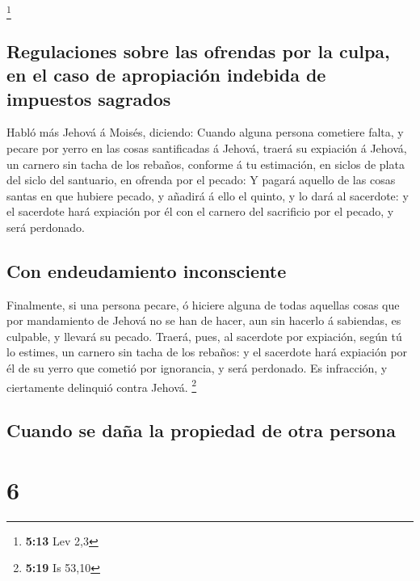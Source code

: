 \footnote{\textbf{5:13} Lev 2,3}

\hypertarget{regulaciones-sobre-las-ofrendas-por-la-culpa-en-el-caso-de-apropiaciuxf3n-indebida-de-impuestos-sagrados}{%
\subsection{Regulaciones sobre las ofrendas por la culpa, en el caso de
apropiación indebida de impuestos
sagrados}\label{regulaciones-sobre-las-ofrendas-por-la-culpa-en-el-caso-de-apropiaciuxf3n-indebida-de-impuestos-sagrados}}

 Habló más Jehová á Moisés, diciendo:  Cuando
alguna persona cometiere falta, y pecare por yerro en las cosas
santificadas á Jehová, traerá su expiación á Jehová, un carnero sin
tacha de los rebaños, conforme á tu estimación, en siclos de plata del
siclo del santuario, en ofrenda por el pecado:  Y pagará
aquello de las cosas santas en que hubiere pecado, y añadirá á ello el
quinto, y lo dará al sacerdote: y el sacerdote hará expiación por él con
el carnero del sacrificio por el pecado, y será perdonado.

\hypertarget{con-endeudamiento-inconsciente}{%
\subsection{Con endeudamiento
inconsciente}\label{con-endeudamiento-inconsciente}}

 Finalmente, si una persona pecare, ó hiciere alguna de
todas aquellas cosas que por mandamiento de Jehová no se han de hacer,
aun sin hacerlo á sabiendas, es culpable, y llevará su pecado.
 Traerá, pues, al sacerdote por expiación, según tú lo
estimes, un carnero sin tacha de los rebaños: y el sacerdote hará
expiación por él de su yerro que cometió por ignorancia, y será
perdonado.  Es infracción, y ciertamente delinquió contra
Jehová. \footnote{\textbf{5:19} Is 53,10}

\hypertarget{cuando-se-dauxf1a-la-propiedad-de-otra-persona}{%
\subsection{Cuando se daña la propiedad de otra
persona}\label{cuando-se-dauxf1a-la-propiedad-de-otra-persona}}

\hypertarget{section-5}{%
\section{6}\label{section-5}}


